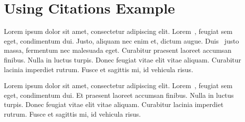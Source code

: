%
%
%

\section{\label{sec:usingcitations}Using Citations Example}

Lorem ipsum dolor sit amet, consectetur adipiscing elit. Lorem~\cite{ExampleArticle}, feugiat sem eget, condimentum dui.
Justo, aliquam nec enim et, dictum augue. Duis~\cite{ExampleBook} justo massa, fermentum nec malesuada eget. Curabitur
praesent laoreet accumsan finibus. Nulla in luctus turpis. Donec feugiat vitae elit vitae aliquam. Curabitur lacinia
imperdiet rutrum. Fusce et sagittis mi, id vehicula risus.

Lorem ipsum dolor sit amet, consectetur adipiscing elit. Lorem~\cite{ExampleUrl}, feugiat sem eget, condimentum dui. Et
praesent laoreet accumsan finibus. Nulla in luctus turpis. Donec feugiat vitae elit vitae aliquam. Curabitur lacinia
imperdiet rutrum. Fusce et sagittis mi, id vehicula risus.
